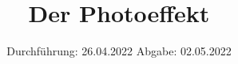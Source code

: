 

\subject{V 500}
\title{Der Photoeffekt}
\date{%
  Durchführung: 26.04.2022
  \hspace{3em}
  Abgabe: 02.05.2022
}



\maketitle
\thispagestyle{empty}
\tableofcontents
\newpage






\printbibliography{}


